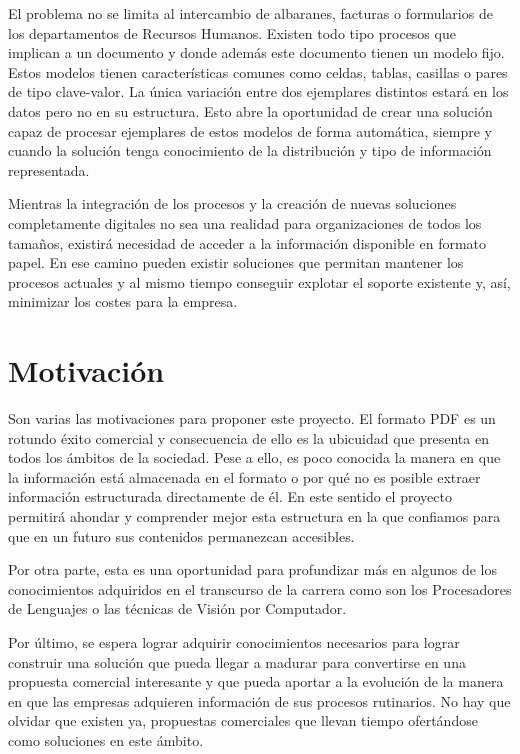 El problema no se limita al intercambio de albaranes, facturas o formularios de los departamentos de Recursos Humanos. Existen todo tipo procesos que implican a un documento y donde además este documento tienen un modelo fijo. Estos modelos tienen características comunes como celdas, tablas, casillas o pares de tipo clave-valor. La única variación entre dos ejemplares distintos estará en los datos pero no en su estructura. Esto abre la oportunidad de crear una solución capaz de procesar ejemplares de estos modelos de forma automática, siempre y cuando la solución tenga conocimiento de la distribución y tipo de información representada. 

Mientras la integración de los procesos y la creación de nuevas soluciones completamente digitales no sea una realidad para organizaciones de todos los tamaños, existirá necesidad de acceder a la información disponible en formato papel. En ese camino pueden existir soluciones que permitan mantener los procesos actuales y al mismo tiempo conseguir explotar el soporte existente y, así, minimizar los costes para la empresa. 

\section{Motivación}

Son varias las motivaciones para proponer este proyecto. El formato PDF es un rotundo éxito comercial y consecuencia de ello es la ubicuidad que presenta en todos los ámbitos de la sociedad. Pese a ello, es poco conocida la manera en que la información está almacenada en el formato o por qué no es posible extraer información estructurada directamente de él. En este sentido el proyecto permitirá ahondar y comprender mejor esta estructura en la que confiamos para que en un futuro sus contenidos permanezcan accesibles.

Por otra parte, esta es una oportunidad para profundizar más en algunos de los conocimientos adquiridos en el transcurso de la carrera como son los Procesadores de Lenguajes o las técnicas de Visión por Computador.

Por último, se espera lograr adquirir conocimientos necesarios para lograr construir una solución que pueda llegar a madurar para convertirse en una propuesta comercial interesante y que pueda aportar a la evolución de la manera en que las empresas adquieren información de sus procesos rutinarios. No hay que olvidar que existen ya, propuestas comerciales que llevan tiempo ofertándose como soluciones en este ámbito.

